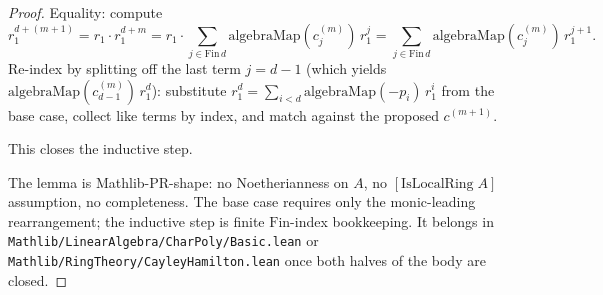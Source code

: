 \begin{proof}
Equality: compute
\[
r_1^{d + (m+1)} = r_1\cdot r_1^{d + m}
= r_1\cdot \sum_{j \in \mathrm{Fin}\,d}
\mathrm{algebraMap}(c^{(m)}_j)\,r_1^{j}
= \sum_{j \in \mathrm{Fin}\,d}
\mathrm{algebraMap}(c^{(m)}_j)\,r_1^{j + 1}.
\]
Re-index by splitting off the last term $j = d - 1$
(which yields $\mathrm{algebraMap}(c^{(m)}_{d-1})\,r_1^{d}$):
substitute $r_1^d = \sum_{i < d}
\mathrm{algebraMap}(-p_i)\,r_1^{i}$ from the base case,
collect like terms by index, and match against the proposed
$c^{(m+1)}$.

This closes the inductive step.

The lemma is Mathlib-PR-shape: no Noetherianness on $A$, no
$[\mathrm{IsLocalRing}\;A]$ assumption, no completeness. The base
case requires only the monic-leading rearrangement; the
inductive step is finite $\mathrm{Fin}$-index bookkeeping. It
belongs in
\texttt{Mathlib/LinearAlgebra/CharPoly/Basic.lean} or
\texttt{Mathlib/RingTheory/CayleyHamilton.lean} once both halves
of the body are closed.
\end{proof}

